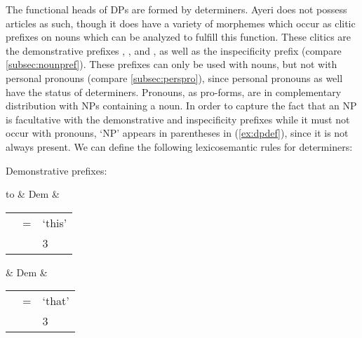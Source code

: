 The functional heads of DPs are formed by determiners. Ayeri does not possess 
articles as such, though it does have a variety of morphemes which occur 
as clitic prefixes on nouns which can be analyzed to fulfill this function. 
These clitics are the demonstrative prefixes , 
, and , as well as the 
inspecificity prefix  (compare \autoref{subsec:nounpref}). 
These prefixes can only be used with nouns, but not with personal pronouns 
(compare \autoref{subsec:perspro}), since personal pronouns as well have the 
status of determiners. Pronouns, as pro-forms, are in complementary 
distribution with NPs containing a noun. In order to capture the fact that an 
NP is facultative with the demonstrative and inspecificity prefixes while it 
must not occur with pronouns, `NP' appears in parentheses in (\ref{ex:dpdef}), 
since it is not always present. We can define the following lexicosemantic 
rules for determiners:

\pex
\a Demonstrative prefixes:\medskip

	\begin{tabu} to \linewidth {X[10l] X[5l] X[85l]} 
		& Dem
		& \begin{tabular}[t]{l c l}
			\ups{\Pred} & = & `this' \\
			\ups{\Pers} & \req{} & 3 \\
		\end{tabular}
	\end{tabu}\medskip

	\begin{tabu} {}
		& Dem
		& \begin{tabular}[t]{l c l}
			\ups{\Pred} & = & `that' \\
			\ups{\Pers} & \req{} & 3 \\
		\end{tabular}
	\end{tabu}\medskip
	
